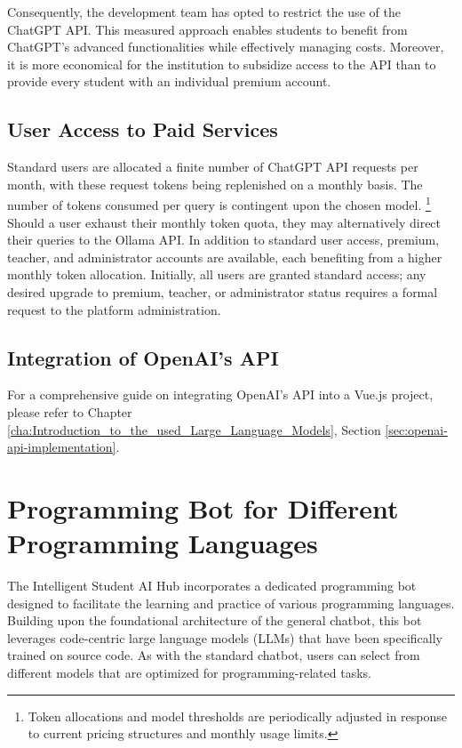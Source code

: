 Consequently, the development team has opted to restrict the use of the ChatGPT API. 
This measured approach enables students to benefit from ChatGPT’s advanced functionalities while effectively managing costs. 
Moreover, it is more economical for the institution to subsidize access to the API than to provide every student with an individual premium account.

\subsection{User Access to Paid Services}

Standard users are allocated a finite number of ChatGPT API requests per month, with these request tokens being replenished on a monthly basis. The number of tokens consumed per query is contingent upon the chosen model.
\footnote{Token allocations and model thresholds are periodically adjusted in response to current pricing structures and monthly usage limits.} 
Should a user exhaust their monthly token quota, they may alternatively direct their queries to the Ollama API. In addition to standard user access, premium, teacher, and administrator accounts are available, each benefiting from a higher monthly token allocation. Initially, all users are granted standard access; any desired upgrade to premium, teacher, or administrator status requires a formal request to the platform administration.

\subsection{Integration of OpenAI's API}

For a comprehensive guide on integrating OpenAI's API into a Vue.js project, please refer to Chapter \ref{cha:Introduction_to_the_used_Large_Language_Models}, Section \ref{sec:openai-api-implementation}.




\section{Programming Bot for Different Programming Languages}

The Intelligent Student AI Hub incorporates a dedicated programming bot designed to facilitate the learning and practice of various programming languages. Building upon the foundational architecture of the general chatbot, this bot leverages code-centric large language models (LLMs) that have been specifically trained on source code. As with the standard chatbot, users can select from different models that are optimized for programming-related tasks.

